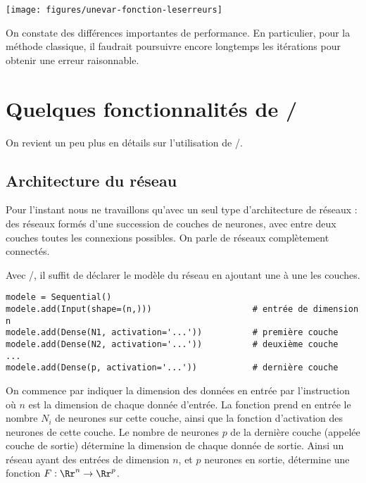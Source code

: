 \documentclass[11pt,class=report,crop=false]{standalone}
\begin{document}
\begin{center}
\texttt{[image: figures/unevar-fonction-leserreurs]}
\end{center}

On constate des différences importantes de performance. En particulier, pour la méthode classique, il faudrait poursuivre encore longtemps les itérations pour obtenir une erreur raisonnable.


\section{Quelques fonctionnalités de \tensorflow/\keras}

On revient un peu plus en détails sur l'utilisation de  \tensorflow/\keras.

\subsection{Architecture du réseau}

Pour l'instant nous ne travaillons qu'avec un seul type d'architecture de réseaux : des réseaux formés d'une succession de couches de neurones, avec entre deux couches toutes les connexions possibles. On parle de réseaux complètement connectés.



Avec \tensorflow/\keras, il suffit de déclarer le modèle du réseau en ajoutant une à une les couches.
\begin{lstlisting} 
modele = Sequential()
modele.add(Input(shape=(n,)))                    # entrée de dimension n
modele.add(Dense(N1, activation='...'))          # première couche
modele.add(Dense(N2, activation='...'))          # deuxième couche
...
modele.add(Dense(p, activation='...'))           # dernière couche
\end{lstlisting}
On commence par indiquer la dimension des données en entrée par l'instruction  où $n$ est la dimension de chaque donnée d'entrée.
La fonction  prend en entrée le nombre $N_i$ de neurones sur cette couche, ainsi que la fonction d'activation des neurones de cette couche.
Le nombre de neurones $p$ de la dernière couche (appelée couche de sortie) détermine la dimension de chaque donnée de sortie. Ainsi un réseau ayant des entrées de dimension $n$, et $p$ neurones en sortie, détermine une fonction $F : \Rr^n \to \Rr^p$.
\end{document}
